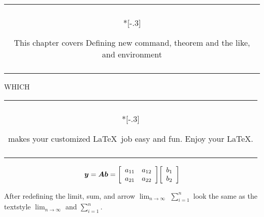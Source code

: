 \documentclass[11pt]{article}
\makeatletter
\newcommand{\dsum}[2]{\displaystyle \sum_{#1}^{#2}}
\newcommand{\go}{\longrightarrow}
\newcommand{\dlim}[1]{{\displaystyle \lim_{#1}}}
\newenvironment{myfbox}[1][\textwidth]%
{\begin{tabular}{|@{\hspace{1em}}c@{\hspace{1em}}|}%
\hline \\*[-.3\baselineskip]
\begin{minipage}[t]{#1}}%
{\end{minipage} \\ \vspace{-.3\baselineskip} \\
\hline \end{tabular}}
\newenvironment{barray}[1]
{\left[\begin{array}{#1}}{\end{array}\right]}
\makeatother
\begin{document}
\begin{myfbox}%
This chapter covers
Defining new command, theorem and the like, and
environment
\end{myfbox} WHICH
\begin{myfbox}%
makes your customized \LaTeX\ job easy and fun.
Enjoy your \LaTeX.
\end{myfbox}

$$
\mbox{{\boldmath $y$}}=\mbox{{\boldmath $Ab$}}
= \begin{barray}{cc} a_{11} & a_{12}  \\ a_{21} & a_{22} \end{barray}
\begin{barray}{c} b_1 \\ b_2 \end{barray}$$

After redefining the limit, sum, and arrow $\dlim{n\go\infty}$ $\dsum{i=1}{n}$ look the same as the textstyle $\lim_{n\go\infty}$ and $\sum_{i=1}^n$.
\end{document}
